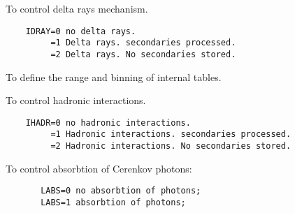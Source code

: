 
\BEGARG
{}
\ENDARG
{}
\ENDOPT

   \par
To control delta rays mechanism.  
\begin{verbatim}
    IDRAY=0 no delta rays.
         =1 Delta rays. secondaries processed.
         =2 Delta rays. No secondaries stored.
\end{verbatim}

\ENDCMD


\BEGARG
{}
\ENDARG

   \par
To define the range and binning of internal tables.  

\ENDCMD


\BEGARG
{}
\ENDARG

   \par
To control hadronic interactions.  
\begin{verbatim}
    IHADR=0 no hadronic interactions.
         =1 Hadronic interactions. secondaries processed.
         =2 Hadronic interactions. No secondaries stored.
\end{verbatim}

\ENDCMD


\BEGARG
{}
\ENDARG

   \par
To control absorbtion of Cerenkov photons:  
\begin{verbatim}
       LABS=0 no absorbtion of photons;
       LABS=1 absorbtion of photons;
\end{verbatim}

\ENDCMD


\BEGARG
{}
\ENDARG
{}
\ENDOPT

